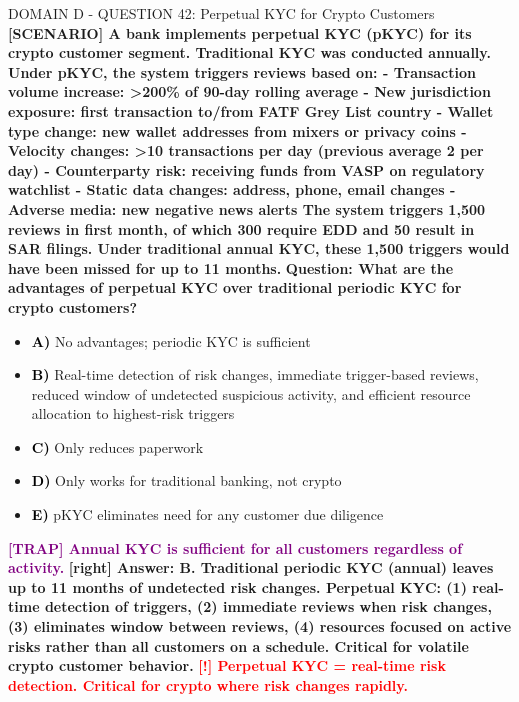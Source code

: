 \documentclass[11pt,a4paper]{beamer}
\newcommand{\redflag}[1]{\textcolor{red}{\textbf{[!] #1}}}
\newcommand{\trap}[1]{\textcolor{purple}{\textbf{[TRAP] #1}}}
\newcommand{\correct}[1]{\textcolor{green!50!black}{\textbf{[right] #1}}}
\newcommand{\scenario}[1]{\textcolor{blue!70!black}{\textbf{[SCENARIO] #1}}}
\newcommand{\option}[1]{\textcolor{black}{\textbf{#1}}}
\begin{document}
\begin{frame}{DOMAIN D - QUESTION 42: Perpetual KYC for Crypto Customers}
\scenario{A bank implements perpetual KYC (pKYC) for its crypto customer segment. Traditional KYC was conducted annually. Under pKYC, the system triggers reviews based on:
- Transaction volume increase: >200\% of 90-day rolling average
- New jurisdiction exposure: first transaction to/from FATF Grey List country
- Wallet type change: new wallet addresses from mixers or privacy coins
- Velocity changes: >10 transactions per day (previous average 2 per day)
- Counterparty risk: receiving funds from VASP on regulatory watchlist
- Static data changes: address, phone, email changes
- Adverse media: new negative news alerts
The system triggers 1,500 reviews in first month, of which 300 require EDD and 50 result in SAR filings. Under traditional annual KYC, these 1,500 triggers would have been missed for up to 11 months.}
\vspace{0.2cm}
\textbf{Question: What are the advantages of perpetual KYC over traditional periodic KYC for crypto customers?}
\vspace{0.1cm}
\begin{itemize}
    \item \option{A)} No advantages; periodic KYC is sufficient
    \item \option{B)} Real-time detection of risk changes, immediate trigger-based reviews, reduced window of undetected suspicious activity, and efficient resource allocation to highest-risk triggers
    \item \option{C)} Only reduces paperwork
    \item \option{D)} Only works for traditional banking, not crypto
    \item \option{E)} pKYC eliminates need for any customer due diligence
\end{itemize}
\vspace{0.2cm}
\trap{Annual KYC is sufficient for all customers regardless of activity.}
\correct{Answer: B. Traditional periodic KYC (annual) leaves up to 11 months of undetected risk changes. Perpetual KYC: (1) real-time detection of triggers, (2) immediate reviews when risk changes, (3) eliminates window between reviews, (4) resources focused on active risks rather than all customers on a schedule. Critical for volatile crypto customer behavior.}
\redflag{Perpetual KYC = real-time risk detection. Critical for crypto where risk changes rapidly.}
\end{frame}
\end{document}
